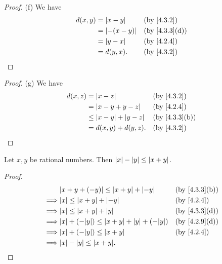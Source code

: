 \begin{proof}{(f)}
	We have
	\begin{align*}
		d(x, y) & = \abs{x - y}    &  & \by{4.3.2}                  \\
		        & = \abs{-(x - y)} &  & \text{(by \cref{4.3.3}(d))} \\
		        & = \abs{y - x}    &  & \by{4.2.4}                  \\
		        & = d(y, x).       &  & \by{4.3.2}
	\end{align*}
\end{proof}

\begin{proof}{(g)}
	We have
	\begin{align*}
		d(x, z) & = \abs{x - z}                  &  & \by{4.3.2}                  \\
		        & = \abs{x - y + y - z}          &  & \by{4.2.4}                  \\
		        & \leq \abs{x - y} + \abs{y - z} &  & \text{(by \cref{4.3.3}(b))} \\
		        & = d(x, y) + d(y, z).           &  & \by{4.3.2}                  \\
	\end{align*}
\end{proof}

\begin{ac}\label{ac:4.3.1}
	Let \(x, y\) be rational numbers.
	Then \(\left\lvert x\right\rvert - \left\lvert y\right\rvert \leq \left\lvert x + y\right\rvert\).
\end{ac}

\begin{proof}
	\begin{align*}
		         & \abs{x + y + (-y)} \leq \abs{x + y} + \abs{-y}               &  & \text{(by \cref{4.3.3}(b))} \\
		\implies & \abs{x} \leq \abs{x + y} + \abs{-y}                          &  & \by{4.2.4}                  \\
		\implies & \abs{x} \leq \abs{x + y} + \abs{y}                           &  & \text{(by \cref{4.3.3}(d))} \\
		\implies & \abs{x} + (-\abs{y}) \leq \abs{x + y} + \abs{y} + (-\abs{y}) &  & \text{(by \cref{4.2.9}(d))} \\
		\implies & \abs{x} + (-\abs{y}) \leq \abs{x + y}                        &  & \by{4.2.4}                  \\
		\implies & \abs{x} - \abs{y} \leq \abs{x + y}.
	\end{align*}
\end{proof}

